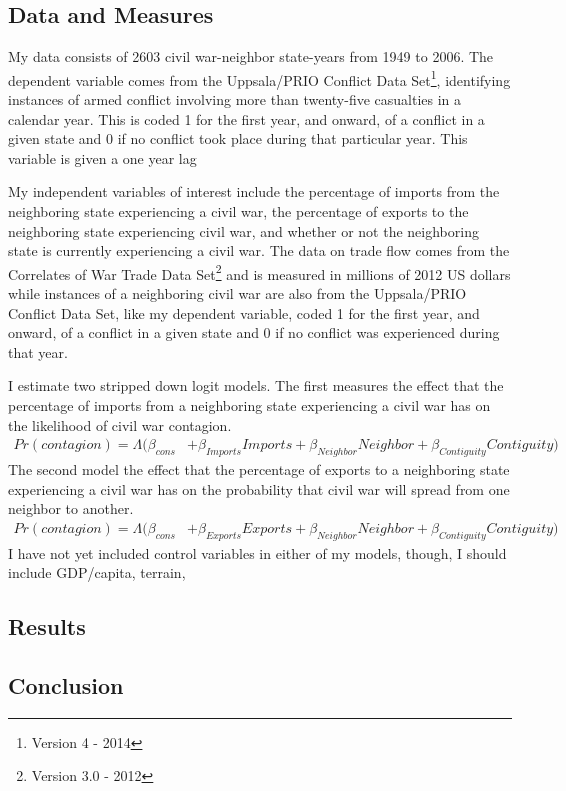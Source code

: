 \documentclass[12pt,letterpaper]{article}
\begin{document}
\subsection*{Data and Measures}
My data consists of 2603 civil war-neighbor state-years from 1949 to 2006. The dependent variable comes from the Uppsala/PRIO Conflict Data Set\footnote{Version 4 - 2014}, identifying instances of armed conflict involving more than twenty-five casualties in a calendar year. This is coded 1 for the first year, and onward, of a conflict in a given state and 0 if no conflict took place during that particular year. This variable is given a one year lag 

My independent variables of interest include the percentage of imports from the neighboring state experiencing a civil war, the percentage of exports to the neighboring state experiencing civil war, and whether or not the neighboring state is currently experiencing a civil war. The data on trade flow comes from the Correlates of War Trade Data Set\footnote{Version 3.0 - 2012} and is measured in millions of 2012 US dollars while instances of a neighboring civil war are also from the Uppsala/PRIO Conflict Data Set, like my dependent variable, coded 1 for the first year, and onward, of a conflict in a given state and 0 if no conflict was experienced during that year. 

I estimate two stripped down logit models. The first measures the effect that the percentage of imports from a neighboring state experiencing a civil war has on the likelihood of civil war contagion.
\footnotesize
\begin{align}
Pr(contagion) = \Lambda(\beta_{cons} &+ \beta_{Imports}Imports + \beta_{Neighbor}Neighbor + \beta_{Contiguity}Contiguity)
\end{align}\label{eqn:1}
\normalsize
The second model the effect that the percentage of exports to a neighboring state experiencing a civil war has on the probability that civil war will spread from one neighbor to another.
\footnotesize
\begin{align}
Pr(contagion) = \Lambda(\beta_{cons} &+ \beta_{Exports}Exports + \beta_{Neighbor}Neighbor + \beta_{Contiguity}Contiguity)
\end{align}\label{eqn:2}
I have not yet included control variables in either of my models, though, I should include GDP/capita, terrain, 
\subsection*{Results}
\subsection*{Conclusion}

\newpage


\end{document}
